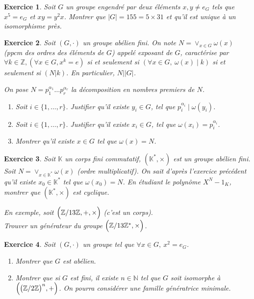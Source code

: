 \documentclass[12pt]{article}
\newtheorem{exercise}{Exercice}[section]
\theoremstyle{remark}
\theoremstyle{remark}
\newcommand{\K}{\mathbb{K}}
\newcommand{\N}{\mathbb{N}}
\newcommand{\Z}{\mathbb{Z}}
\begin{document}
\begin{exercise}
	Soit $G$ un groupe engendré par deux éléments $x,y\neq e_{G}$ tels que
	$x^5=e_{G}$ et $xy=y^2x$. Montrer que $\vert G\vert=155=5\times31$ et qu'il
	est unique à un isomorphisme près.
\end{exercise}

\begin{exercise}
	Soit $(G,\cdot)$ un groupe abélien fini. On note $N=\vee_{x\in G}\omega(x)$
	(ppcm des ordres des éléments de $G$) appelé exposant de $G$, caractérise
	par $\forall k\in\Z, (\forall x\in G,x^{k}=e)$ si et seulement si $(\forall
	x\in G,~\omega(x)\mid k)$ si et seulement si $(N\vert k)$. En particulier,
	$N\mid\vert G\vert$.

	On pose $N=p_{1}^{\alpha_{1}}\dots p_{r}^{\alpha_{r}}$ la décomposition en
	nombres premiers de $N$.
	\begin{enumerate}
		\item Soit $i\in\{1,\dots,r\}$. Justifier qu'il existe $y_{i}\in G$, tel
		que $p_{i}^{\alpha_{i}}\mid \omega(y_{i})$.
		\item Soit $i\in\{1,\dots,r\}$. Justifier qu'il existe $x_{i}\in G$, tel
		que $\omega(x_{i})=p_{i}^{\alpha_{i}}$.
		\item Montrer qu'il existe $x\in G$ tel que $\omega(x)=N$.
	\end{enumerate}
\end{exercise}

\begin{exercise}
	Soit $\K$ un corps fini commutatif, $(\K^*,\times)$ est un groupe abélien fini.
	Soit $N=\vee_{x\in \K^*}\omega(x)$ (ordre multiplicatif). On sait d'après
	l'exercice précédent qu'il existe $x_{0}\in\K^*$ tel que $\omega(x_{0})=N$.
	En étudiant le polynôme $X^{N}-1_{K}$, montrer que $(\K^*,\times)$ est
	cyclique.
	
	En exemple, soit $\Bigl(\Z/13\Z,+,\times\Bigr)$ (c'est un corps).\\
	Trouver un générateur du groupe $\Bigl(\Z/13\Z^*,\times\Bigr)$.
\end{exercise}

\begin{exercise}
	Soit $(G,\cdot)$ un groupe tel que $\forall x\in G,~x^2=e_{G}$.
	\begin{enumerate}
		\item Montrer que $G$ est abélien.
		\item Montrer que si $G$ est fini, il existe $n\in\N$ tel que $G$ soit
		isomorphe à $\Bigl(\bigl(\Z/2\Z\bigr)^n,+\Bigr)$. On pourra considérer
		une famille génératrice minimale.
	\end{enumerate}
\end{exercise}
\end{document}
